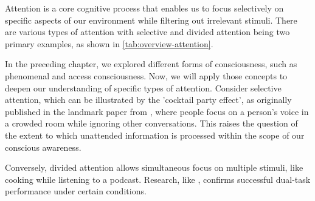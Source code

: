 \documentclass[10pt]{article}
\begin{document}
\begin{sloppypar}
  Attention is a core cognitive process that enables us to focus selectively on specific aspects of our environment while filtering out irrelevant stimuli. There are various types of attention with selective \citep{koivisto_relationship_2009} and divided attention \citep{mckanna_divided_2009} being two primary examples, as shown in \autoref{tab:overview-attention}.

  In the preceding chapter, we explored different forms of consciousness, such as phenomenal and access consciousness. Now, we will apply those concepts to deepen our understanding of specific types of attention. Consider selective attention, which can be illustrated by the 'cocktail party effect', as originally published in the landmark paper from \cite{cherry_experiments_1953}, where people focus on a person’s voice in a crowded room while ignoring other conversations. This raises the question of the extent to which unattended information is processed within the scope of our conscious awareness.

  Conversely, divided attention allows simultaneous focus on multiple stimuli, like cooking while listening to a podcast. Research, like \cite{rodrigue_spatio-temporal_2015}, confirms successful dual-task performance under certain conditions.

  \vspace{10pt} %
  \begin{table}[ht]
    \centering
    \renewcommand{\arraystretch}{1.5}
    \setlength{\tabcolsep}{12pt}
    \caption{Two major types of attention and their descriptions.}
    \label{tab:overview-attention}
  \end{table}


\end{sloppypar}
\end{document}
